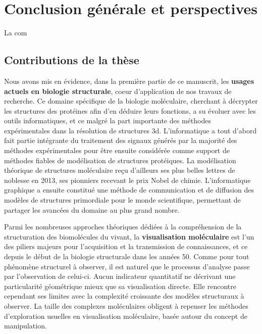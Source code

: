 


\chapter*{Conclusion générale et perspectives}
\mtcaddchapter

\mtcaddpart




La com



\section*{Contributions de la thèse}

Nous avons mis en évidence, dans la première partie de ce manuscrit, les \textbf{usages actuels en biologie structurale}, coeur d'application de nos travaux de recherche. Ce domaine spécifique de la biologie moléculaire, cherchant à décrypter les structures des protéines afin d'en déduire leurs fonctions, a su évoluer avec les outils informatiques, et ce malgré la part importante des méthodes expérimentales dans la résolution de structures 3d. 
L'informatique a tout d'abord fait partie intégrante du traitement des signaux générés par la majorité des méthodes expérimentales pour être ensuite considérée comme support de méthodes fiables de modélisation de structures protéiques. La modélisation théorique de structures moléculaire reçu d'ailleurs ses plus belles lettres de noblesse en 2013, ses pionniers recevant le prix Nobel de chimie. L'informatique graphique a ensuite constitué une méthode de communication et de diffusion des modèles de structures primordiale pour le monde scientifique, permettant de partager les avancées du domaine au plus grand nombre.

Parmi les nombreuses approches théoriques dédiées à la compréhension de la structuration des biomolécules du vivant, la \textbf{visualisation moléculaire} est l'un des piliers majeurs pour l'acquisition et la transmission de connaissances, et ce depuis le début de la biologie structurale dans les années 50. Comme pour tout phénomène structurel à observer, il est naturel que le processus d'analyse passe par l'observation de celui-ci. Aucun indicateur quantitatif ne décrivant une particularité géométrique mieux que sa visualisation directe. Elle rencontre cependant ses limites avec la complexité croissante des modèles structuraux à observer. La taille des complexes moléculaires obligent à repenser les méthodes d'exploration usuelles en visualisation moléculaire, basée autour du concept de manipulation.


